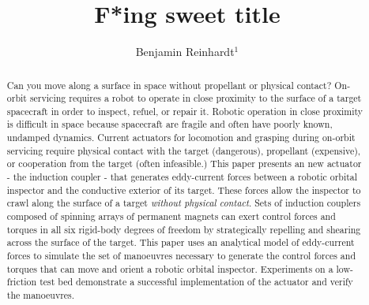 \documentclass[letterpaper, 10 pt, conference]{ieeeconf}  %
\title{\LARGE \bf
F*ing sweet title
}
\author{Benjamin Reinhardt$^{1}$ %
}
\begin{document}
\maketitle
\thispagestyle{empty}
\pagestyle{empty}


\begin{abstract}

Can you move along a surface in space without propellant or physical contact? On-orbit servicing requires a robot to operate in close proximity to the surface of a target spacecraft in order to inspect, refuel, or repair it.  Robotic operation in close proximity is difficult in space because spacecraft are fragile and often have poorly known, undamped dynamics. Current actuators for locomotion and grasping during on-orbit servicing require physical contact with the target (dangerous), propellant (expensive), or cooperation from the target (often infeasible.)   
%
This paper presents an new actuator - the induction coupler - that generates eddy-current forces between a robotic orbital inspector and the conductive exterior of its target. These forces allow the inspector to crawl along the surface of a target \textit{without physical contact}. Sets of induction couplers composed of spinning arrays of permanent magnets can exert control forces and torques in all six rigid-body degrees of freedom by strategically repelling and shearing across the surface of the target. 
%
This paper uses an analytical model of eddy-current forces to simulate the set of manoeuvres necessary to generate the control forces and torques that can move and orient a robotic orbital inspector. Experiments on a low-friction test bed demonstrate a successful implementation of the actuator and verify the manoeuvres.

\end{abstract}


\listoftodos
\end{document}

